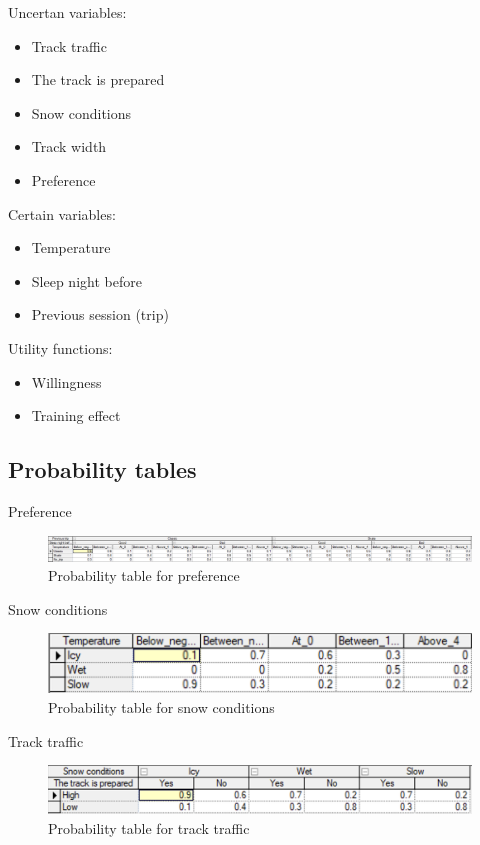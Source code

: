 \documentclass{article}
\begin{document}
Uncertan variables:
\begin{itemize}
    \item Track traffic
    \item The track is prepared
    \item Snow conditions
    \item Track width
    \item Preference
\end{itemize}

Certain variables:
\begin{itemize}
    \item Temperature
    \item Sleep night before
    \item Previous session (trip)
\end{itemize}

Utility functions:
\begin{itemize}
    \item Willingness
    \item Training effect
\end{itemize}

\subsection*{Probability tables}

Preference

\begin{figure}[h]
    \centering
    \includegraphics[width=\linewidth]{images/preference.png}
    \caption{Probability table for preference}
    \label{fig:image2}
\end{figure}

Snow conditions

\begin{figure}[h]
    \centering
    \includegraphics[width=\linewidth]{images/snow_conditions.png}
    \caption{Probability table for snow conditions}
    \label{fig:image3}
\end{figure}

Track traffic

\begin{figure}[h]
    \centering
    \includegraphics[width=\linewidth]{images/track_traffic.png}
    \caption{Probability table for track traffic}
    \label{fig:image4}
\end{figure}
\end{document}
